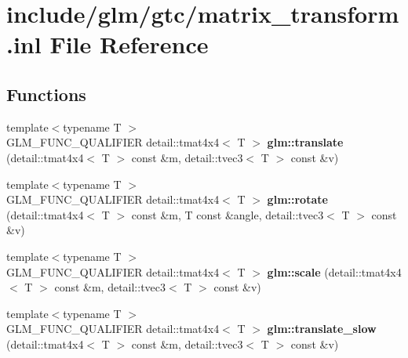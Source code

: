 \hypertarget{matrix__transform_8inl}{\section{include/glm/gtc/matrix\-\_\-transform.inl \-File \-Reference}
\label{matrix__transform_8inl}
}
\subsection*{\-Functions}
\begin{DoxyCompactItemize}
\item 
\hypertarget{namespaceglm_a3081fcd9eeeca858d8e1cd479b2f7890}{{\footnotesize template$<$typename T $>$ }\\\-G\-L\-M\-\_\-\-F\-U\-N\-C\-\_\-\-Q\-U\-A\-L\-I\-F\-I\-E\-R \*
detail\-::tmat4x4$<$ \-T $>$ {\bfseries glm\-::translate} (detail\-::tmat4x4$<$ \-T $>$ const \&m, detail\-::tvec3$<$ \-T $>$ const \&v)}\label{namespaceglm_a3081fcd9eeeca858d8e1cd479b2f7890}

\item 
\hypertarget{namespaceglm_ae75820e817587b8c26d1bfa30bcb40bc}{{\footnotesize template$<$typename T $>$ }\\\-G\-L\-M\-\_\-\-F\-U\-N\-C\-\_\-\-Q\-U\-A\-L\-I\-F\-I\-E\-R \*
detail\-::tmat4x4$<$ \-T $>$ {\bfseries glm\-::rotate} (detail\-::tmat4x4$<$ \-T $>$ const \&m, \-T const \&angle, detail\-::tvec3$<$ \-T $>$ const \&v)}\label{namespaceglm_ae75820e817587b8c26d1bfa30bcb40bc}

\item 
\hypertarget{namespaceglm_a1d9b114602e4a7195b252c1740b2d382}{{\footnotesize template$<$typename T $>$ }\\\-G\-L\-M\-\_\-\-F\-U\-N\-C\-\_\-\-Q\-U\-A\-L\-I\-F\-I\-E\-R \*
detail\-::tmat4x4$<$ \-T $>$ {\bfseries glm\-::scale} (detail\-::tmat4x4$<$ \-T $>$ const \&m, detail\-::tvec3$<$ \-T $>$ const \&v)}\label{namespaceglm_a1d9b114602e4a7195b252c1740b2d382}

\item 
\hypertarget{namespaceglm_aa2b6b80e7eef76aee5212899971fb11b}{{\footnotesize template$<$typename T $>$ }\\\-G\-L\-M\-\_\-\-F\-U\-N\-C\-\_\-\-Q\-U\-A\-L\-I\-F\-I\-E\-R \*
detail\-::tmat4x4$<$ \-T $>$ {\bfseries glm\-::translate\-\_\-slow} (detail\-::tmat4x4$<$ \-T $>$ const \&m, detail\-::tvec3$<$ \-T $>$ const \&v)}\label{namespaceglm_aa2b6b80e7eef76aee5212899971fb11b}


\end{DoxyCompactItemize}
